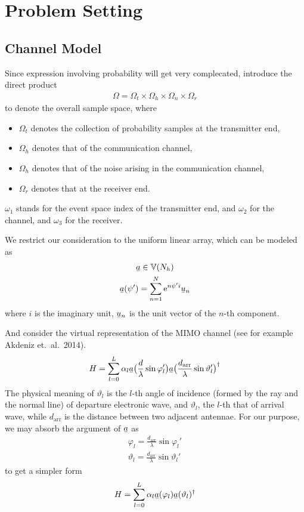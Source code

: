 \documentclass[12pt]{article}
\newcommand{\MB}[1]{\mathbb{#1}}
\newcommand{\RM}[1]{\mathrm{#1}}
\newcommand{\V}[1]{\stackunder[1.2pt]{$#1$}{\rule{.9ex}{.075ex}}}
\renewcommand{\H}{\dagger}
\begin{document}
\section{Problem Setting}

\subsection{Channel Model}

Since expression involving probability will get very complecated, introduce the direct product
\begin{gather}
\Omega
=\Omega_t \times \Omega_h \times \Omega_n \times \Omega_r
\end{gather}
to denote the overall sample space, where

\begin{itemize}
\item \(\Omega_t\) denotes the collection of probability samples at the transmitter end,
\item \(\Omega_h\) denotes that of the communication channel,
\item \(\Omega_h\) denotes that of the noise arising in the communication channel,
\item \(\Omega_r\) denotes that at the receiver end.
\end{itemize}
%
\(\omega_1\) stands for the event space index of the transmitter end, and \(\omega_2\) for the channel, and \(\omega_3\) for the receiver.


We restrict our consideration to the uniform linear array, which can be modeled as
\begin{gather}
\V{a} \in \MB{V}(N_h) \\
\V{a}(\psi')
=\sum_{n=1}^{N} \RM{e}^{n \psi' i} \V{u}_n
\end{gather}
where \(i\) is the imaginary unit, \(\V{u}_n\) is the unit vector of the \(n\)-th component.

And consider the virtual representation of the MIMO channel (see for example Akdeniz et.\ al.\ 2014).
\begin{gather}
H
=\sum_{l=0}^L \alpha_l \V{a}\big( \frac{d}{\lambda} \sin \varphi_l' \big) \V{a}\big( \frac{d_{\RM{arr}}}{\lambda} \sin \vartheta_l' \big)^\H
\end{gather}
The physical meaning of \(\vartheta_l\) is the \(l\)-th angle of incidence (formed by the ray and the normal line) of departure electronic wave, and \(\vartheta_l\), the \(l\)-th that of arrival wave, while \(d_{\RM{arr}}\) is the distance between two adjacent antennae.
For our purpose, we may absorb the argument of \(\V{a}\) as
\begin{gather}
\varphi_l
=\frac{d_{\RM{arr}}}{\lambda} \sin \varphi_l' \\
\vartheta_l
=\frac{d_{\RM{arr}}}{\lambda} \sin \vartheta_l'
\end{gather}
to get a simpler form
\begin{gather}
H
=\sum_{l=0}^L \alpha_l \V{a}(\varphi_l) \V{a}(\vartheta_l)^\H
\end{gather}
\end{document}

